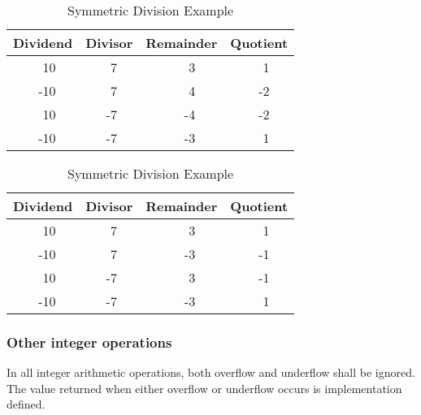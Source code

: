 \begin{table}[ht]
\begin{center}
  \begin{minipage}{0.48\textwidth}
	\begin{center}
		\caption{Floored Division Example}

		\label{table:floor}
		\begin{tabular}{lrllrllrllrl}
		\hline\hline
		\multicolumn{3}{c}{Dividend} &
		\multicolumn{3}{c}{Divisor} &
		\multicolumn{3}{c}{Remainder} &
		\multicolumn{3}{c}{Quotient} \\
		\hline
		&  10 &&&  7 &&&  3 &&&  1 \\
		& -10 &&&  7 &&&  4 &&& -2 \\
		&  10 &&& -7 &&& -4 &&& -2 \\
		& -10 &&& -7 &&& -3 &&&  1 \\
		\hline\hline
		\end{tabular}
	\end{center}
  \end{minipage}
  \begin{minipage}{0.48\textwidth}
	\begin{center}
		\caption{Symmetric Division Example}
		\label{table:round}
		\begin{tabular}{lrllrllrllrl}
		\hline\hline
		\multicolumn{3}{c}{Dividend} &
		\multicolumn{3}{c}{Divisor} &
		\multicolumn{3}{c}{Remainder} &
		\multicolumn{3}{c}{Quotient} \\
		\hline
		&  10 &&&  7 &&&  3 &&&  1 \\
		& -10 &&&  7 &&& -3 &&& -1 \\
		&  10 &&& -7 &&&  3 &&& -1 \\
		& -10 &&& -7 &&& -3 &&&  1 \\
		\hline\hline
		\end{tabular}
	\end{center}
  \end{minipage}
\end{center}
\end{table}

\subsubsection{Other integer operations} %
\label{usage:intops}

In all integer arithmetic operations, both overflow and underflow
shall be ignored. The value returned when either overflow or
underflow occurs is implementation defined.

